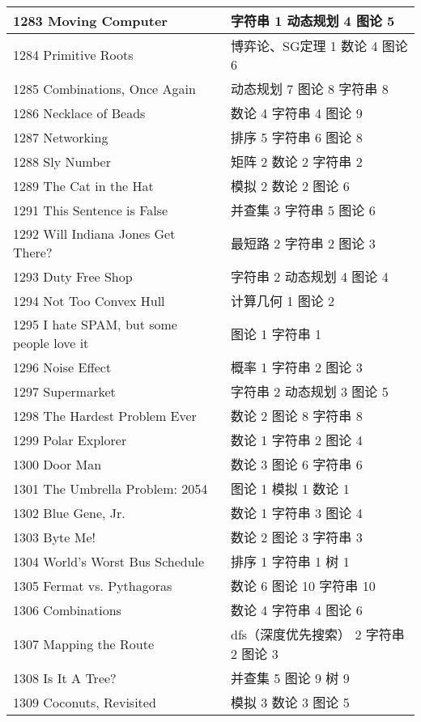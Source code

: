 \begin{longtable}{| p{} | p{} |}
 1283 Moving Computer  & 字符串 1 动态规划 4 图论 5 \\ \hline
 1284 Primitive Roots  & 博弈论、SG定理 1 数论 4 图论 6 \\ \hline
 1285 Combinations, Once Again  & 动态规划 7 图论 8 字符串 8 \\ \hline
 1286 Necklace of Beads  & 数论 4 字符串 4 图论 9 \\ \hline
 1287 Networking  & 排序 5 字符串 6 图论 8 \\ \hline
 1288 Sly Number  & 矩阵 2 数论 2 字符串 2 \\ \hline
 1289 The Cat in the Hat  & 模拟 2 数论 2 图论 6 \\ \hline
 1291 This Sentence is False  & 并查集 3 字符串 5 图论 6 \\ \hline
 1292 Will Indiana Jones Get There?  & 最短路 2 字符串 2 图论 3 \\ \hline
 1293 Duty Free Shop  & 字符串 2 动态规划 4 图论 4 \\ \hline
 1294 Not Too Convex Hull  & 计算几何 1 图论 2 \\ \hline
 1295 I hate SPAM, but some people love it  & 图论 1 字符串 1 \\ \hline
 1296 Noise Effect  & 概率 1 字符串 2 图论 3 \\ \hline
 1297 Supermarket  & 字符串 2 动态规划 3 图论 5 \\ \hline
 1298 The Hardest Problem Ever  & 数论 2 图论 8 字符串 8 \\ \hline
 1299 Polar Explorer  & 数论 1 字符串 2 图论 4 \\ \hline
 1300 Door Man  & 数论 3 图论 6 字符串 6 \\ \hline
 1301 The Umbrella Problem: 2054  & 图论 1 模拟 1 数论 1 \\ \hline
 1302 Blue Gene, Jr.  & 数论 1 字符串 3 图论 4 \\ \hline
 1303 Byte Me!  & 数论 2 图论 3 字符串 3 \\ \hline
 1304 World's Worst Bus Schedule  & 排序 1 字符串 1 树 1 \\ \hline
 1305 Fermat vs. Pythagoras  & 数论 6 图论 10 字符串 10 \\ \hline
 1306 Combinations  & 数论 4 字符串 4 图论 6 \\ \hline
 1307 Mapping the Route  & dfs（深度优先搜索） 2 字符串 2 图论 3 \\ \hline
 1308 Is It A Tree?  & 并查集 5 图论 9 树 9 \\ \hline
 1309 Coconuts, Revisited  & 模拟 3 数论 3 图论 5 \\ \hline

\end{longtable}
